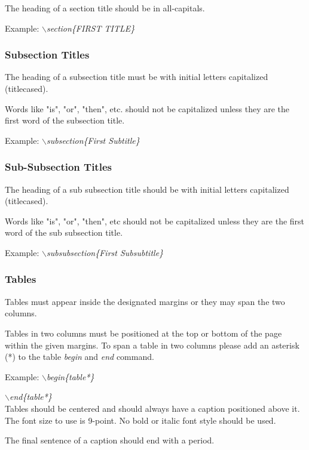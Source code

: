 \documentclass[a4paper,twoside]{article}
\begin{document}
The heading of a section title should be in all-capitals.

Example: \textit{$\backslash$section\{FIRST TITLE\}}

\vfill
\subsubsection{Subsection Titles}

The heading of a subsection title must be with initial letters
capitalized (titlecased).

Words like "is", "or", "then", etc. should not be capitalized unless
they are the first word of the subsection title.

Example: \textit{$\backslash$subsection\{First Subtitle\}}

\subsubsection{Sub-Subsection Titles}

The heading of a sub subsection title should be with initial letters
capitalized (titlecased).

Words like "is", "or", "then", etc should not be capitalized unless
they are the first word of the sub subsection title.

Example: \textit{$\backslash$subsubsection\{First Subsubtitle\}}

\subsubsection{Tables}

Tables must appear inside the designated margins or they may span
the two columns.

Tables in two columns must be positioned at the top or bottom of the
page within the given margins. To span a table in two columns please add an asterisk (*) to the table \textit{begin} and \textit{end} command.

Example: \textit{$\backslash$begin\{table*\}}

\hspace*{1.5cm}\textit{$\backslash$end\{table*\}}\\

Tables should be centered and should always have a caption
positioned above it. The font size to use is 9-point. No bold or
italic font style should be used.

The final sentence of a caption should end with a period.
\end{document}

